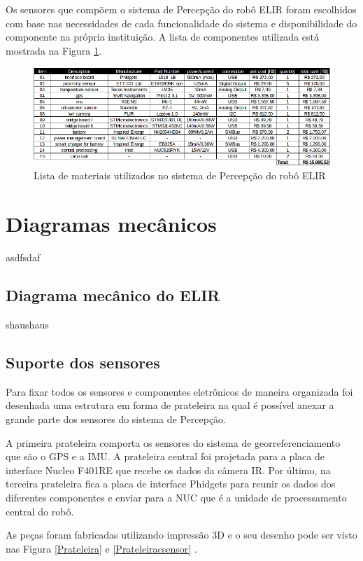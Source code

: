 Os sensores que compõem o sistema de Percepção do robô ELIR foram escolhidos com base nas necessidades de cada funcionalidade do sistema e disponibilidade do componente na própria instituição. A lista de componentes utilizada está mostrada na Figura \ref{fig:list_mat}.

\begin{figure}[h]
	\centering
	\includegraphics[width=16cm]{Figures/lista_materiais.png}
	\caption{Lista de materiais utilizados no sistema de Percepção do robô ELIR}
	\label{fig:list_mat}
\end{figure}


\section{Diagramas mecânicos}
\label{sec:diagm}
asdfsdaf

\subsection{Diagrama mecânico do ELIR}
shaushaus

\subsection{Suporte dos sensores}

Para  fixar  todos  os  sensores  e  componentes  eletrônicos  de  maneira  organizada foi desenhada uma estrutura em forma de prateleira  na qual é possível anexar a grande parte dos sensores do sistema de Percepção.

 A primeira prateleira comporta os sensores do sistema de georreferenciamento que são o GPS e a IMU. A prateleira central foi projetada para a placa de interface Nucleo F401RE que recebe os dados da câmera IR. Por último, na terceira prateleira fica a placa de interface Phidgets para reunir os dados dos diferentes componentes e enviar para a NUC que é a  unidade de processamento central do robô.

As peças foram fabricadas utilizando impressão 3D e o seu desenho pode ser visto nas Figura \ref{Prateleira} e \ref{Prateleiracsensor} .

